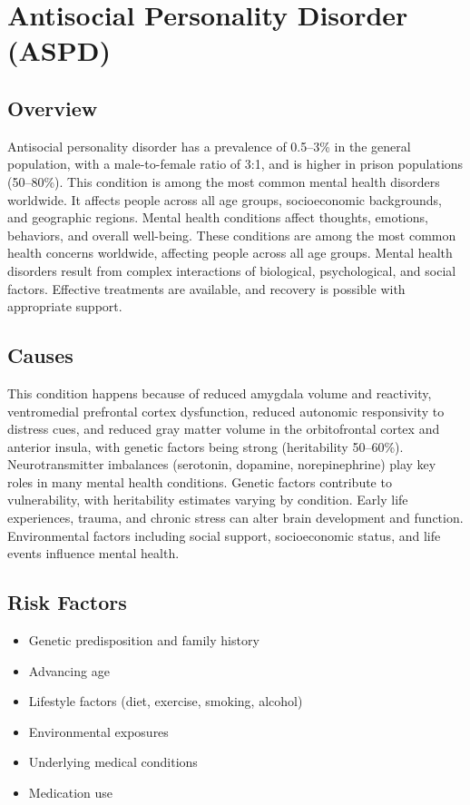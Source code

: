 \chapter{Antisocial Personality Disorder (ASPD)}
\label{sec:Antisocial Personality Disorder (ASPD)}

\section{Overview}
Antisocial personality disorder has a prevalence of 0.5--3\% in the general population, with a male-to-female ratio of 3:1, and is higher in prison populations (50--80\%). This condition is among the most common mental health disorders worldwide. It affects people across all age groups, socioeconomic backgrounds, and geographic regions. Mental health conditions affect thoughts, emotions, behaviors, and overall well-being. These conditions are among the most common health concerns worldwide, affecting people across all age groups. Mental health disorders result from complex interactions of biological, psychological, and social factors. Effective treatments are available, and recovery is possible with appropriate support.
\section{Causes}
This condition happens because of reduced amygdala volume and reactivity, ventromedial prefrontal cortex dysfunction, reduced autonomic responsivity to distress cues, and reduced gray matter volume in the orbitofrontal cortex and anterior insula, with genetic factors being strong (heritability 50--60\%).  Neurotransmitter imbalances (serotonin, dopamine, norepinephrine) play key roles in many mental health conditions. Genetic factors contribute to vulnerability, with heritability estimates varying by condition. Early life experiences, trauma, and chronic stress can alter brain development and function. Environmental factors including social support, socioeconomic status, and life events influence mental health.   
\section{Risk Factors}
\begin{itemize}[noitemsep]
  \item Genetic predisposition and family history
  \item Advancing age
  \item Lifestyle factors (diet, exercise, smoking, alcohol)
  \item Environmental exposures
  \item Underlying medical conditions
  \item Medication use
\end{itemize}
